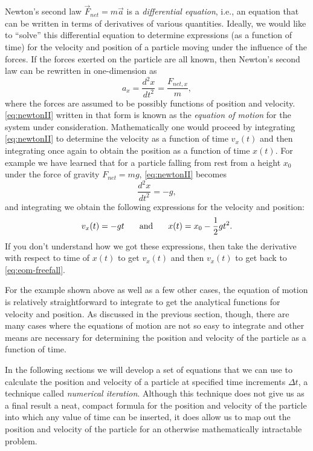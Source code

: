 Newton's second law $\vec{F}_{ net} = m\vec{a}$ is a \emph{differential equation}, i.e., an equation that can be written in
terms of derivatives of various quantities.  Ideally, we would like
to ``solve'' this differential equation to 
determine expressions (as a function of time) for the velocity and
position of a particle moving under the influence of the forces.
If the forces exerted on the particle are
all known, then Newton's second law can be rewritten in one-dimension
as
\begin{equation}
  a_x = \frac{d^2x}{dt^2} = \frac{F_{{ net},x}}{m},
  \label{eq:newtonII}
\end{equation}
where the forces are assumed to be possibly functions of position and
velocity.  \eqref{eq:newtonII} written in that form is known as
the \emph{equation of motion} for the system under consideration.
Mathematically one would proceed by integrating \eqref{eq:newtonII} 
to determine the velocity as a function of time
$v_x(t)$ and then integrating once again to obtain the position as a
function of time $x(t)$.  For example we have learned that for a
particle falling from rest from a height $x_0$ under the force of
gravity $F_{ net} = mg$, \eqref{eq:newtonII} becomes
\begin{equation}
  \frac{d^2x}{dt^2} = -g,
  \label{eq:eom-freefall}
\end{equation}
and integrating we obtain the following expressions for the velocity
and position:
\begin{equation}
  v_x(t) = -gt \mbox{\hspace{0.25in}and\hspace{0.25in}}x(t) = x_0 - 
  \frac{1}{2}gt^2.
\end{equation}
If you don't understand how we got these expressions, then take the
derivative with respect to time of $x(t)$ to get $v_x(t)$ and then
$v_x(t)$ to get back to \eqref{eq:eom-freefall}.

For the example shown above as well as a few other cases, the equation
of motion is relatively straightforward to integrate to get the
analytical functions for velocity and position.  As discussed in the previous
section, though, there are many cases
where the equations of motion are not so easy to integrate and other
means are necessary for determining the position and velocity of the
particle as a function of time.

In the following sections we will develop a set of equations that we
can use to calculate the position and velocity of a particle at
specified time increments $\Delta t$, a technique called \emph{numerical iteration}.  Although this technique does not give us as a
final result a neat, compact formula for the position and velocity of
the particle into which any value of time can be inserted, it does
allow us to map out the position and velocity of the particle for an
otherwise mathematically intractable problem.

